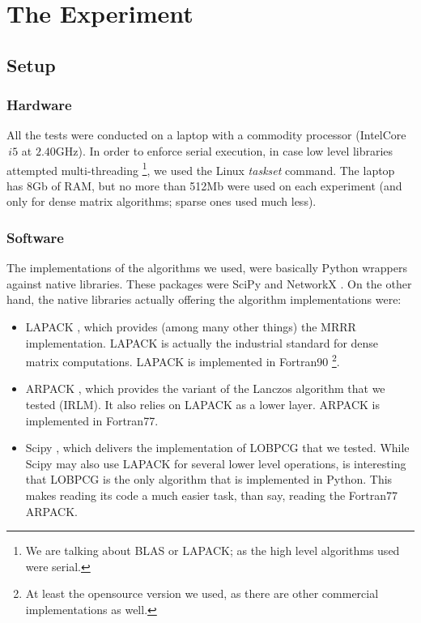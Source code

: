\chapter{The Experiment}
\label{cha:exper}

\section{Setup}

\subsection{Hardware}

All the tests were conducted on a laptop with a commodity processor
(Intel\textregistered Core\texttrademark $\,i5$ at $2.40$GHz). In
order to enforce serial execution, in case low level libraries attempted multi-threading \footnote{We are talking about BLAS 
  or LAPACK; as the high level algorithms used were serial.}, we used
the Linux  
\emph{taskset} command. The laptop has $8$Gb of RAM, but no more than 512Mb
were used on each experiment (and only for dense matrix algorithms;
sparse ones used much less). \\

\subsection{Software}

The implementations of the algorithms we used, were basically Python
wrappers against native libraries. These packages were SciPy
\cite{scipy} and NetworkX \cite{networkx}. On the other hand, the
native libraries actually offering the algorithm implementations were:

\begin{itemize}
  \item LAPACK \cite{lapack}, which provides (among many other things)
    the \gls{MRRR} implementation. LAPACK is actually the industrial
    standard for dense matrix computations. LAPACK is implemented in
    Fortran90 \footnote{At least the opensource version we used, as
      there are other commercial implementations as well.}.

  \item ARPACK \cite{arpack}, which provides the variant of the
    Lanczos algorithm that we tested (\gls{IRLM}). It also relies on LAPACK
    as a lower layer. ARPACK is implemented in Fortran77.

  \item Scipy \cite{scipy}, which delivers the implementation of
    \gls{LOBPCG} that we tested. While Scipy may also use LAPACK for several
    lower level operations, is interesting that \gls{LOBPCG} is the only
    algorithm that is implemented in Python. This makes reading its
    code a much easier task, than say, reading the Fortran77 ARPACK. 
\end{itemize}

